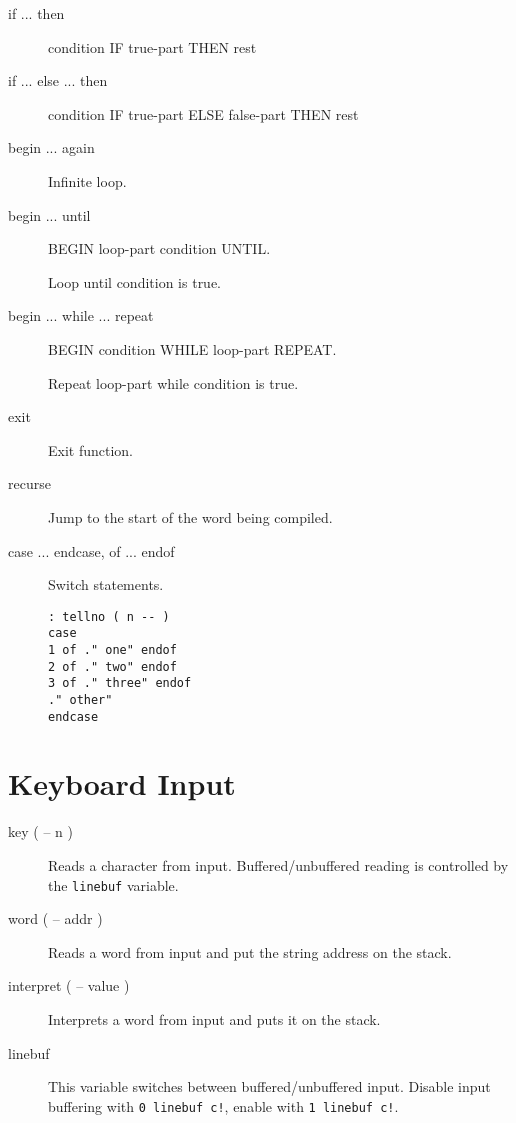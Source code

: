 \begin{description}
\item[if ... then]

condition IF true-part THEN rest

\item[if ... else ... then]

condition IF true-part ELSE false-part THEN rest

\item[begin ... again]

Infinite loop.

\item[begin ... until]

BEGIN loop-part condition UNTIL.

Loop until condition is true.

\item[begin ... while ... repeat]

BEGIN condition WHILE loop-part REPEAT.

Repeat loop-part while condition is true.

\item[exit]

Exit function.

\item[recurse] Jump to the start of the word being compiled.

\item[case ... endcase, of ... endof] Switch statements.

\begin{verbatim}
: tellno ( n -- )
case
1 of ." one" endof
2 of ." two" endof
3 of ." three" endof
." other"
endcase
\end{verbatim}

\end{description}

\section{Keyboard Input}

\begin{description}
\item[key ( -- n )]

Reads a character from input. Buffered/unbuffered reading is controlled by the \texttt{linebuf} variable.

\item[word ( -- addr )] Reads a word from input and put the string address on the stack.
\item[interpret ( -- value )] Interprets a word from input and puts it on the stack.

\item[linebuf]

This variable switches between buffered/unbuffered input. Disable input buffering with \texttt{0 linebuf c!}, enable with \texttt{1 linebuf c!}.

\end{description}

